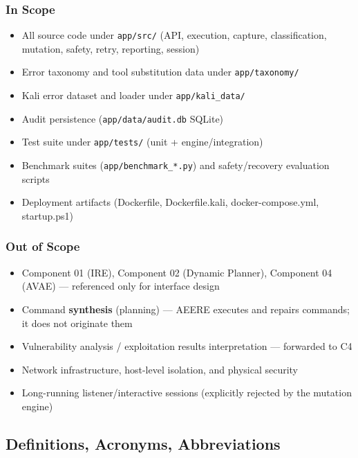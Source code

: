 \documentclass[10pt,journal,onecolumn]{IEEEtran}
\begin{document}
\subsubsection{In Scope}

\begin{itemize}
\item All source code under \texttt{app/src/} (API, execution, capture, classification, mutation, safety, retry, reporting, session)
\item Error taxonomy and tool substitution data under \texttt{app/taxonomy/}
\item Kali error dataset and loader under \texttt{app/kali\_data/}
\item Audit persistence (\texttt{app/data/audit.db} SQLite)
\item Test suite under \texttt{app/tests/} (unit + engine/integration)
\item Benchmark suites (\texttt{app/benchmark\_*.py}) and safety/recovery evaluation scripts
\item Deployment artifacts (Dockerfile, Dockerfile.kali, docker-compose.yml, startup.ps1)
\end{itemize}

\subsubsection{Out of Scope}

\begin{itemize}
\item Component 01 (IRE), Component 02 (Dynamic Planner), Component 04 (AVAE) --- referenced only for interface design
\item Command \textbf{synthesis} (planning) --- AEERE executes and repairs commands; it does not originate them
\item Vulnerability analysis / exploitation results interpretation --- forwarded to C4
\item Network infrastructure, host-level isolation, and physical security
\item Long-running listener/interactive sessions (explicitly rejected by the mutation engine)
\end{itemize}

\subsection{Definitions, Acronyms, Abbreviations}
\end{document}
